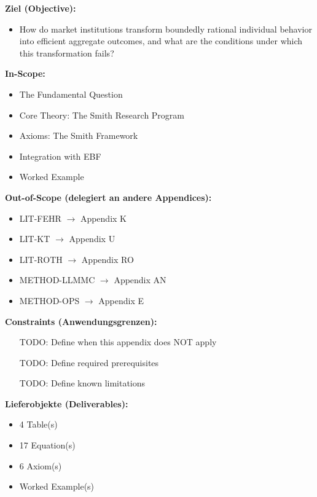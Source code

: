 \begin{tcolorbox}[
    colback=orange!5!white,
    colframe=orange!75!black,
    title={\textbf{Appendix Scope: Ziel / In-Scope / Out-of-Scope / Constraints}},
    fonttitle=\bfseries
]

\textbf{Ziel (Objective):}
\begin{itemize}[nosep]
    \item How do market institutions transform boundedly rational individual
behavior into efficient aggregate outcomes, and what are the conditions under
which this transformation fails?
\end{itemize}

\textbf{In-Scope:}
\begin{itemize}[nosep]
    \item The Fundamental Question
    \item Core Theory: The Smith Research Program
    \item Axioms: The Smith Framework
    \item Integration with EBF
    \item Worked Example
\end{itemize}

\textbf{Out-of-Scope (delegiert an andere Appendices):}
\begin{itemize}[nosep]
    \item LIT-FEHR $\rightarrow$ Appendix K
    \item LIT-KT $\rightarrow$ Appendix U
    \item LIT-ROTH $\rightarrow$ Appendix RO
    \item METHOD-LLMMC $\rightarrow$ Appendix AN
    \item METHOD-OPS $\rightarrow$ Appendix E
\end{itemize}

\textbf{Constraints (Anwendungsgrenzen):}
\begin{itemize}[nosep]
    \item [TODO: Define when this appendix does NOT apply]
    \item [TODO: Define required prerequisites]
    \item [TODO: Define known limitations]
\end{itemize}

\textbf{Lieferobjekte (Deliverables):}
\begin{itemize}[nosep]
    \item 4 Table(s)
    \item 17 Equation(s)
    \item 6 Axiom(s)
    \item Worked Example(s)
\end{itemize}

\end{tcolorbox}




